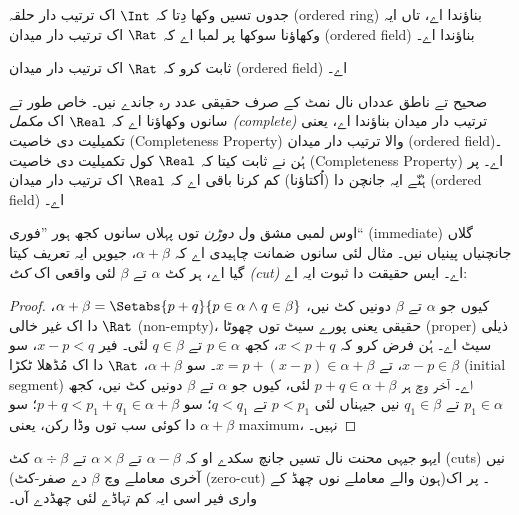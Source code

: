 \documentclass[../../../include/open-logic-section]{subfiles}
\begin{document}
جدوں تسیں وکھا دِتا کہ $\Int$ اک ترتیب دار حلقہ (ordered ring) بناؤندا اے، تاں ایہ
وکھاؤنا سوکھا پر لمبا اے کہ $\Rat$ اک ترتیب دار میدان (ordered field) بناؤندا اے۔

\begin{prob}
ثابت کرو کہ $\Rat$ اک ترتیب دار میدان (ordered field) اے۔
\end{prob}

صحیح تے ناطق عدداں نال نمٹ کے صرف حقیقی عدد رہ جاندے نیں۔ خاص طور تے
سانوں وکھاؤنا اے کہ $\Real$ اک \emph{مکمل (complete)} ترتیب دار میدان بناؤندا اے،
یعنی تکمیلیت دی خاصیت (Completeness Property) والا ترتیب دار میدان
(ordered field)۔ ہُن  نے ثابت کیتا کہ
$\Real$ کول تکمیلیت دی خاصیت (Completeness Property) اے۔ پر ہُنّے ایہ
جانچن دا (اُکتاؤنا) کم کرنا باقی اے کہ $\Real$ اک ترتیب دار میدان
(ordered field) اے۔

اوس لمبی مشق ول \emph{دوڑن} توں پہلاں سانوں کجھ ہور ”فوری“ (immediate) گلاں
جانچنیاں پینیاں نیں۔ مثال لئی سانوں ضمانت چاہیدی اے کہ $\alpha +
\beta$، جیویں ایہ تعریف کیتا گیا اے، ہر کٹ $\alpha$ تے $\beta$ لئی
واقعی اک \emph{کٹ (cut)} اے۔ ایس حقیقت دا ثبوت ایہ اے:

\begin{proof}
کیوں جو $\alpha$ تے $\beta$ دونیں کٹ نیں، $\alpha + \beta = \Setabs{p
+ q}{p \in \alpha \land q \in \beta}$، $\Rat$ دا اک غیر خالی (non-empty)،
حقیقی یعنی پورے سیٹ توں چھوٹا (proper) ذیلی سیٹ اے۔ ہُن فرض کرو کہ $x < p + q$، کجھ $p \in \alpha$ تے
$q \in \beta$ لئی۔ فیر $x - p < q$، سو $x - p \in \beta$، تے
$x = p + (x - p) \in \alpha + \beta$۔ سو $\alpha + \beta$، $\Rat$
دا اک مُڈھلا ٹکڑا (initial segment) اے۔ آخر وچ ہر $p + q \in \alpha + \beta$ لئی، کیوں
جو $\alpha$ تے $\beta$ دونیں کٹ نیں، کجھ $p_1 \in \alpha$ تے
$q_1 \in \beta$ نیں جیہناں لئی $p < p_1$ تے $q < q_1$؛ سو
$p + q < p_1 + q_1 \in \alpha + \beta$؛ سو $\alpha + \beta$ دا
کوئی سب توں وڈا رکن، یعنی maximum، نہیں۔
\end{proof}

ایہو جیہی محنت نال تسیں جانچ سکدے او کہ $\alpha - \beta$ تے
$\alpha \times \beta$ تے $\alpha \div \beta$ کٹ (cuts) نیں (آخری معاملے وچ
$\beta$ دے صفر-کٹ (zero-cut) ہون والے معاملے نوں چھڈ کے)۔ پر اک واری فیر
اسی ایہ کم تہاڈے لئی چھڈدے آں۔
\end{document}
